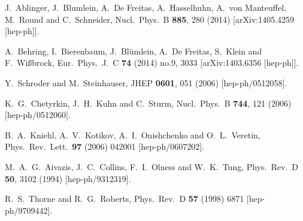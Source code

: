 \documentclass[letter,11pt]{article}
\begin{document}
\begin{thebibliography}{99}
  J.~Ablinger, J.~Blumlein, A.~De Freitas, A.~Hasselhuhn, A.~von Manteuffel, M.~Round and C.~Schneider,
  Nucl.\ Phys.\ B {\bf 885}, 280 (2014)
  [arXiv:1405.4259 [hep-ph]].

  A.~Behring, I.~Bierenbaum, J.~Blümlein, A.~De Freitas, S.~Klein and F.~Wißbrock,
  Eur.\ Phys.\ J.\ C {\bf 74} (2014) no.9,  3033
  [arXiv:1403.6356 [hep-ph]].

  Y.~Schroder and M.~Steinhauser,
  JHEP {\bf 0601}, 051 (2006)
  [hep-ph/0512058].

  K.~G.~Chetyrkin, J.~H.~Kuhn and C.~Sturm,
  Nucl.\ Phys.\ B {\bf 744}, 121 (2006)
  [hep-ph/0512060].

  B.~A.~Kniehl, A.~V.~Kotikov, A.~I.~Onishchenko and O.~L.~Veretin,
  Phys.\ Rev.\ Lett.\  {\bf 97} (2006) 042001
  [hep-ph/0607202].

  M.~A.~G.~Aivazis, J.~C.~Collins, F.~I.~Olness and W.~K.~Tung,
  Phys.\ Rev.\ D {\bf 50}, 3102 (1994)
  [hep-ph/9312319].

  R.~S.~Thorne and R.~G.~Roberts,
  Phys.\ Rev.\ D {\bf 57} (1998) 6871
  [hep-ph/9709442].


\end{thebibliography}
\end{document}
